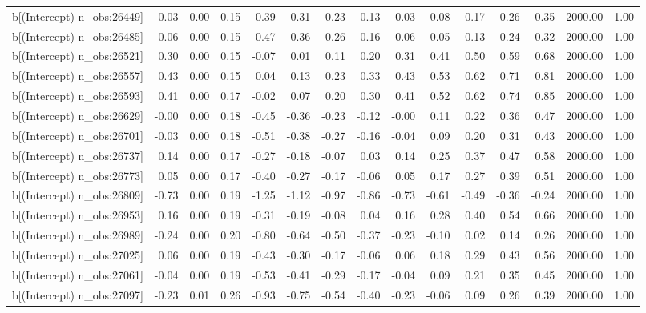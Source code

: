 \begin{table}[ht]
\begin{tabular}{rrrrrrrrrrrrrrr}
  b[(Intercept) n\_obs:26449] & -0.03 & 0.00 & 0.15 & -0.39 & -0.31 & -0.23 & -0.13 & -0.03 & 0.08 & 0.17 & 0.26 & 0.35 & 2000.00 & 1.00 \\ 
  b[(Intercept) n\_obs:26485] & -0.06 & 0.00 & 0.15 & -0.47 & -0.36 & -0.26 & -0.16 & -0.06 & 0.05 & 0.13 & 0.24 & 0.32 & 2000.00 & 1.00 \\ 
  b[(Intercept) n\_obs:26521] & 0.30 & 0.00 & 0.15 & -0.07 & 0.01 & 0.11 & 0.20 & 0.31 & 0.41 & 0.50 & 0.59 & 0.68 & 2000.00 & 1.00 \\ 
  b[(Intercept) n\_obs:26557] & 0.43 & 0.00 & 0.15 & 0.04 & 0.13 & 0.23 & 0.33 & 0.43 & 0.53 & 0.62 & 0.71 & 0.81 & 2000.00 & 1.00 \\ 
  b[(Intercept) n\_obs:26593] & 0.41 & 0.00 & 0.17 & -0.02 & 0.07 & 0.20 & 0.30 & 0.41 & 0.52 & 0.62 & 0.74 & 0.85 & 2000.00 & 1.00 \\ 
  b[(Intercept) n\_obs:26629] & -0.00 & 0.00 & 0.18 & -0.45 & -0.36 & -0.23 & -0.12 & -0.00 & 0.11 & 0.22 & 0.36 & 0.47 & 2000.00 & 1.00 \\ 
  b[(Intercept) n\_obs:26701] & -0.03 & 0.00 & 0.18 & -0.51 & -0.38 & -0.27 & -0.16 & -0.04 & 0.09 & 0.20 & 0.31 & 0.43 & 2000.00 & 1.00 \\ 
  b[(Intercept) n\_obs:26737] & 0.14 & 0.00 & 0.17 & -0.27 & -0.18 & -0.07 & 0.03 & 0.14 & 0.25 & 0.37 & 0.47 & 0.58 & 2000.00 & 1.00 \\ 
  b[(Intercept) n\_obs:26773] & 0.05 & 0.00 & 0.17 & -0.40 & -0.27 & -0.17 & -0.06 & 0.05 & 0.17 & 0.27 & 0.39 & 0.51 & 2000.00 & 1.00 \\ 
  b[(Intercept) n\_obs:26809] & -0.73 & 0.00 & 0.19 & -1.25 & -1.12 & -0.97 & -0.86 & -0.73 & -0.61 & -0.49 & -0.36 & -0.24 & 2000.00 & 1.00 \\ 
  b[(Intercept) n\_obs:26953] & 0.16 & 0.00 & 0.19 & -0.31 & -0.19 & -0.08 & 0.04 & 0.16 & 0.28 & 0.40 & 0.54 & 0.66 & 2000.00 & 1.00 \\ 
  b[(Intercept) n\_obs:26989] & -0.24 & 0.00 & 0.20 & -0.80 & -0.64 & -0.50 & -0.37 & -0.23 & -0.10 & 0.02 & 0.14 & 0.26 & 2000.00 & 1.00 \\ 
  b[(Intercept) n\_obs:27025] & 0.06 & 0.00 & 0.19 & -0.43 & -0.30 & -0.17 & -0.06 & 0.06 & 0.18 & 0.29 & 0.43 & 0.56 & 2000.00 & 1.00 \\ 
  b[(Intercept) n\_obs:27061] & -0.04 & 0.00 & 0.19 & -0.53 & -0.41 & -0.29 & -0.17 & -0.04 & 0.09 & 0.21 & 0.35 & 0.45 & 2000.00 & 1.00 \\ 
  b[(Intercept) n\_obs:27097] & -0.23 & 0.01 & 0.26 & -0.93 & -0.75 & -0.54 & -0.40 & -0.23 & -0.06 & 0.09 & 0.26 & 0.39 & 2000.00 & 1.00 \\ 

\end{tabular}
\end{table}
